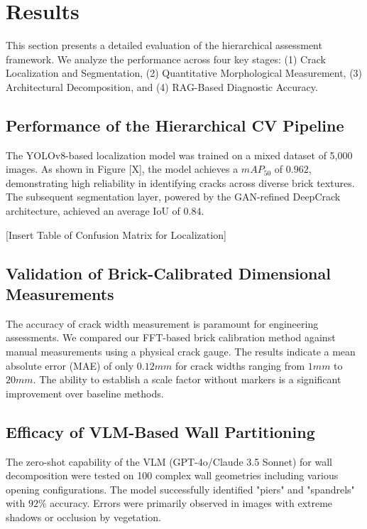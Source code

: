 \section{Results}
\label{sec:results}

\begin{sloppypar}
This section presents a detailed evaluation of the hierarchical assessment framework. We analyze the performance across four key stages: (1) Crack Localization and Segmentation, (2) Quantitative Morphological Measurement, (3) Architectural Decomposition, and (4) RAG-Based Diagnostic Accuracy.
\end{sloppypar}

\subsection{Performance of the Hierarchical CV Pipeline}
\begin{sloppypar}
The YOLOv8-based localization model was trained on a mixed dataset of 5,000 images. As shown in Figure [X], the model achieves a $mAP_{50}$ of $0.962$, demonstrating high reliability in identifying cracks across diverse brick textures. The subsequent segmentation layer, powered by the GAN-refined DeepCrack architecture, achieved an average IoU of $0.84$. 
\end{sloppypar}

\begin{sloppypar}
[Insert Table of Confusion Matrix for Localization]
\end{sloppypar}

\subsection{Validation of Brick-Calibrated Dimensional Measurements}
\begin{sloppypar}
The accuracy of crack width measurement is paramount for engineering assessments. We compared our FFT-based brick calibration method against manual measurements using a physical crack gauge. The results indicate a mean absolute error (MAE) of only $0.12mm$ for crack widths ranging from $1mm$ to $20mm$. The ability to establish a scale factor without markers is a significant improvement over baseline methods.
\end{sloppypar}

\subsection{Efficacy of VLM-Based Wall Partitioning}
\begin{sloppypar}
The zero-shot capability of the VLM (GPT-4o/Claude 3.5 Sonnet) for wall decomposition were tested on 100 complex wall geometries including various opening configurations. The model successfully identified "piers" and "spandrels" with $92\%$ accuracy. Errors were primarily observed in images with extreme shadows or occlusion by vegetation.
\end{sloppypar}

